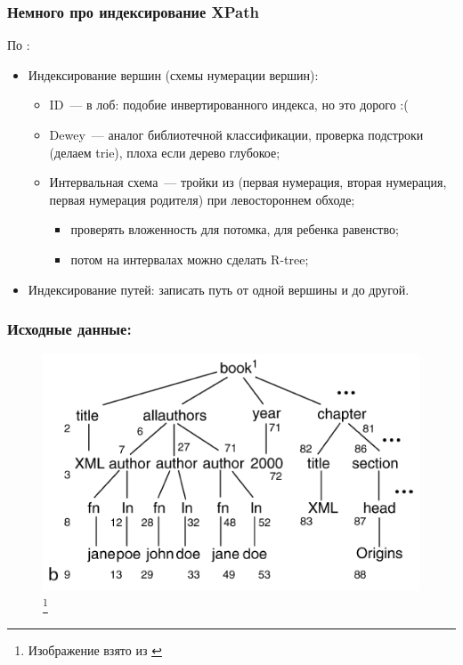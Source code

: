 \documentclass{beamer}
\begin{document}


\begin{frame}
\frametitle{Немного про индексирование XPath}

По \cite{Luna2009}:

\begin{itemize}
  \setlength\itemsep{1em}
  \item Индексирование вершин (схемы нумерации вершин):
  \begin{itemize}
    \item ID~--- в лоб: подобие инвертированного индекса, но это дорого :(
    \item Dewey~--- аналог библиотечной классификации, проверка подстроки (делаем trie), плоха если дерево глубокое;
    \item Интервальная схема~--- тройки из (первая нумерация, вторая нумерация, первая нумерация родителя) при левостороннем обходе;
    \begin{itemize}
      \item проверять вложенность для потомка, для ребенка равенство;
      \item потом на интервалах можно сделать R-tree;
    \end{itemize}    
  \end{itemize}
  \item Индексирование путей: записать путь от одной вершины и до другой.
\end{itemize}
\end{frame}

\begin{frame}
\frametitle{Исходные данные:}
\begin{figure}[htb]
\includegraphics[width=\textwidth,height=0.65\textheight,keepaspectratio]{xml-id.png} 
\footnote{\tiny{Изображение взято из \cite{Luna2009}}}
\end{figure}    
\end{frame}
\end{document}
